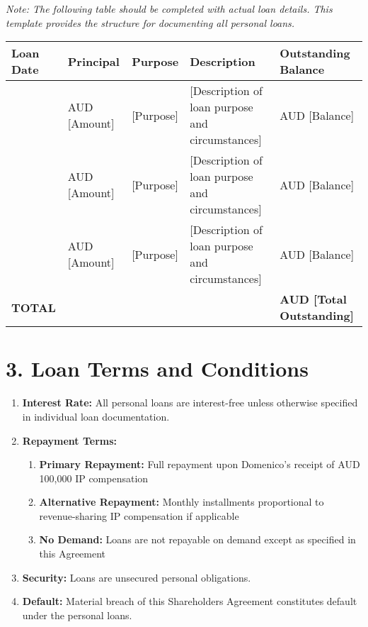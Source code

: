 \textit{Note: The following table should be completed with actual loan details. This template provides the structure for documenting all personal loans.}

\begin{tabularx}{\textwidth}{@{} l l l X l @{}}
\textbf{Loan Date} & \textbf{Principal} & \textbf{Purpose} & \textbf{Description} & \textbf{Outstanding Balance} \\
\hline
[Date] & AUD [Amount] & [Purpose] & [Description of loan purpose and circumstances] & AUD [Balance] \\
\hline
[Date] & AUD [Amount] & [Purpose] & [Description of loan purpose and circumstances] & AUD [Balance] \\
\hline
[Date] & AUD [Amount] & [Purpose] & [Description of loan purpose and circumstances] & AUD [Balance] \\
\hline
\textbf{TOTAL} & & & & \textbf{AUD [Total Outstanding]} \\
\end{tabularx}

\section*{3. Loan Terms and Conditions}

\begin{enumerate}[label=\arabic*.]
\item \textbf{Interest Rate:} All personal loans are interest-free unless otherwise specified in individual loan documentation.

\item \textbf{Repayment Terms:} 
    \begin{enumerate}[label=(\alph*)]
    \item \textbf{Primary Repayment:} Full repayment upon Domenico's receipt of AUD 100,000 IP compensation
    \item \textbf{Alternative Repayment:} Monthly installments proportional to revenue-sharing IP compensation if applicable
    \item \textbf{No Demand:} Loans are not repayable on demand except as specified in this Agreement
    \end{enumerate}

\item \textbf{Security:} Loans are unsecured personal obligations.

\item \textbf{Default:} Material breach of this Shareholders Agreement constitutes default under the personal loans.
\end{enumerate}

